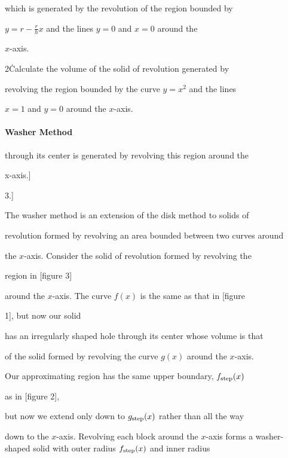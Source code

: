    which is generated by the revolution of the region bounded by

    $y=r-\frac{r}{h}x$ and the lines $y=0$ and $x=0$ around the

    $x$-axis.





2\. Calculate the volume of the solid of revolution generated by

    revolving the region bounded by the curve $y=x^2$ and the lines

    $x=1$ and $y=0$ around the $x$-axis.



\paragraph{Washer Method}




through its center is generated by revolving this region around the

x-axis.]


3.]



The washer method is an extension of the disk method to solids of

revolution formed by revolving an area bounded between two curves around

the $x$-axis. Consider the solid of revolution formed by revolving the

region in [figure 3]

around the $x$-axis. The curve $f(x)$ is the same as that in [figure

1], but now our solid

has an irregularly shaped hole through its center whose volume is that

of the solid formed by revolving the curve $g(x)$ around the $x$-axis.

Our approximating region has the same upper boundary, $f_{\rm step}(x)$

as in [figure 2],

but now we extend only down to $g _{\rm step}(x)$ rather than all the way

down to the $x$-axis. Revolving each block around the $x$-axis forms a washer-shaped solid with outer radius $f_{\rm step}(x)$ and inner radius


